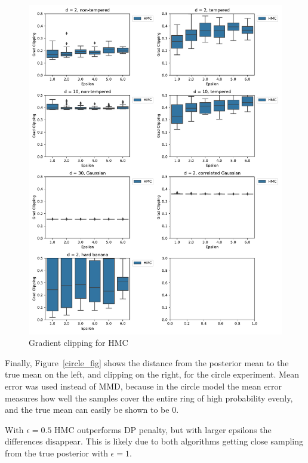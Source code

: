 ﻿\documentclass[a4paper]{article}
\begin{document}
\begin{figure}[h]
  \centering
  \includegraphics[width=\textwidth]{figures/banana_grad_clipping}
  \caption{Gradient clipping for HMC}
  \label{banana_gradient_clipping_fig}
\end{figure}

Finally, Figure~\ref{circle_fig} shows the distance from the posterior mean
to the true mean on the left, and clipping on the right, for the circle
experiment. Mean error was used instead of MMD, because in the circle model the
mean error measures how well the samples cover the entire ring of high probability
evenly, and the true mean can easily be shown to be 0.

With \(\epsilon = 0.5\) HMC outperforms DP penalty, but with larger
epsilons the differences disappear. This is likely due to both algorithms getting
close sampling from the true posterior with \(\epsilon = 1\).
\end{document}
